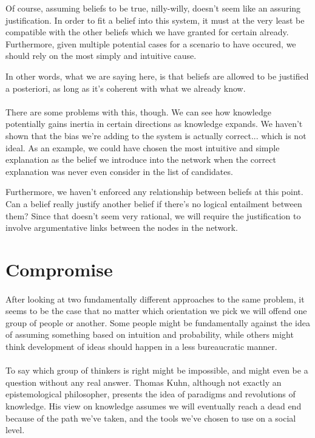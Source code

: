 \documentclass[11pt]{article}
\begin{document}
	Of course, assuming beliefs to be true, nilly-willy, doesn't seem like an assuring justification. In order to fit a belief into this system, it must at the very least be compatible with the other beliefs which we have granted for certain already. Furthermore, given multiple potential cases for a scenario to have occured, we should rely on the most simply and intuitive cause.
	
	In other words, what we are saying here, is that beliefs are allowed to be justified a posteriori, as long as it's coherent with what we already know.

	\paragraph{} There are some problems with this, though. We can see how knowledge potentially gains inertia in certain directions as knowledge expands. We haven't shown that the bias we're adding to the system is actually correct... which is not ideal. As an example, we could have chosen the most intuitive and simple explanation as the belief we introduce into the network when the correct explanation was never even consider in the list of candidates.
	
	Furthermore, we haven't enforced any relationship between beliefs at this point. Can a belief really justify another belief if there's no logical entailment between them? Since that doesn't seem very rational, we will require the justification to involve argumentative links between the nodes in the network.


	\section*{Compromise}
	\paragraph{} After looking at two fundamentally different approaches to the same problem, it seems to be the case that no matter which orientation we pick we will offend one group of people or another. Some people might be fundamentally against the idea of assuming something based on intuition and probability, while others might think development of ideas should happen in a less bureaucratic manner.

	\paragraph{} To say which group of thinkers is right might be impossible, and might even be a question without any real answer. Thomas Kuhn, although not exactly an epistemological philosopher, presents the idea of paradigms and revolutions of knowledge. His view on knowledge assumes we will eventually reach a dead end because of the path we've taken, and the tools we've chosen to use on a social level.
\end{document}
